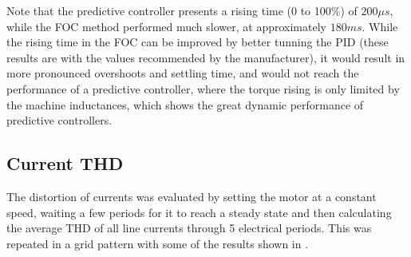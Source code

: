 \documentclass[9pt,conference]{IEEEtran}
\begin{document}
Note that the predictive controller presents a rising time (0 to 100\%) of $200\mu s$, while the FOC method performed much slower, at approximately $180ms$. While the rising time in the FOC can be improved by better tunning the PID (these results are with the values recommended by the manufacturer), it would result in more pronounced overshoots and settling time, and would not reach the performance of a predictive controller, where the torque rising is only limited by the machine inductances, which shows the great dynamic performance of predictive controllers.

\subsection{Current THD}

The distortion of currents was evaluated by setting the motor at a constant speed, waiting a few periods for it to reach a steady state and then calculating the average THD of all line currents through 5 electrical periods. This was repeated in a grid pattern with some of the results shown in .
\end{document}
